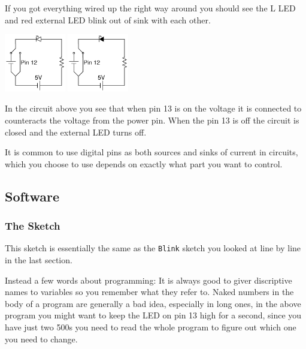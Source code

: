 If you got everything wired up the right way around
you should see the L LED and red external LED blink out of sink 
with each other.

\begin{center}
\includegraphics[width=0.2\textwidth]{./Graphics/ledOn13Rev.pdf}
\includegraphics[width=0.2\textwidth]{./Graphics/ledOff13Rev.pdf}
\end{center}

In the circuit above you see that when pin 13 is on
the voltage it is connected to counteracts the voltage 
from the power pin.
When the pin 13 is off the circuit is closed 
and the external LED turns off.

It is common to use digital pins as both sources
and sinks of current in circuits, which you choose
to use depends on exactly what part you want to
control.


\subsection{Software}
\subsubsection{The Sketch}



This sketch is essentially the same as the \lstinline|Blink| sketch 
you looked at line by line in the last section.

Instead a few words about programming:
It is always good to giver discriptive names to variables so you remember what they refer to.
Naked numbers in the body of a program are generally a bad idea,
especially in long ones,
in the above program you might want to keep the LED on pin 13 high for a second,
since you have just two 500s you need to read the whole program to figure out which one you need to change.

